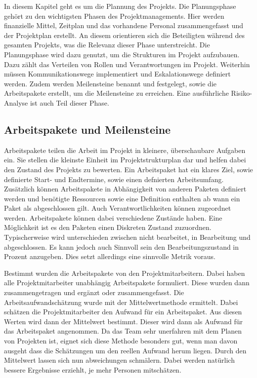 \documentclass[ThesisDJ.tex]{subfiles}
\begin{document}
In diesem Kapitel geht es um die Plannung des Projekts. Die Planungsphase gehört zu den wichtigsten Phasen des Projektmanagements. Hier werden finanzielle Mittel, Zeitplan und das vorhandene Personal zusammengefasst und der Projektplan erstellt. An diesem orientieren sich die Beteiligten während des gesamten Projekts, was die Relevanz dieser Phase unterstreicht. Die Planungsphase wird dazu genutzt, um die Strukturen im Projekt aufzubauen. Dazu zählt das Verteilen von Rollen und Verantwortungen im Projekt. Weiterhin müssen Kommunikationswege implementiert und Eskalationswege definiert werden. 
Zudem werden Meilensteine benannt und festgelegt, sowie die Arbeitspakete erstellt, um die Meilensteine zu erreichen. Eine ausführliche Risiko-Analyse ist auch Teil dieser Phase. 

\subsection{Arbeitspakete und Meilensteine}
Arbeitspakete teilen die Arbeit im Projekt in kleinere, überschaubare Aufgaben ein. Sie stellen die kleinste Einheit im Projektstrukturplan dar und helfen dabei den Zustand des Projekts zu bewerten.
Ein Arbeitspaket hat ein klares Ziel, sowie definierte Start- und Endtermine, sowie einen defnierten Arbeitsumfang. Zusätzlich können Arbeitspakete in Abhängigkeit von anderen Paketen definiert werden und benötigte Ressourcen sowie eine Definition enthalten ab wann ein Paket als abgeschlossen gilt. Auch Verantwortlichkeiten können zugeordnet werden. 
Arbeitspakete können dabei verschiedene Zustände haben. Eine Möglichkeit ist es den Paketen einen Diskreten Zustand zuzuordnen. Typischerweise wird unterschieden zwischen nicht bearbeitet, in Bearbeitung und abgeschlossen. Es kann jedoch auch Sinnvoll sein den Bearbeitungszustand in Prozent anzugeben. Dies setzt allerdings eine sinnvolle Metrik voraus. 

Bestimmt wurden die Arbeitspakete von den Projektmitarbeitern. Dabei haben alle Projektmitarbeiter unabhängig Arbeitspakete formuliert. Diese wurden dann zusammengetragen und ergänzt oder zusammengefasst.
Die Arbeitsaufwandschätzung wurde mit der Mittelwertmethode ermittelt. Dabei schätzen die Projektmitarbeiter den Aufwand für ein Arbeitspaket. Aus diesen Werten wird dann der Mittelwert bestimmt. Dieser wird dann als Aufwand für das Arbeitspaket angenommen. 
Da das Team sehr unerfahren mit dem Planen von Projekten ist, eignet sich diese Methode besonders gut, wenn man davon ausgeht dass die Schätzungen um den reellen Aufwand herum liegen. Durch den Mittelwert lassen sich nun abweichungen schmälern. Dabei werden natürlich bessere Ergebnisse erziehlt, je mehr Personen mitschätzen. 
\end{document}
